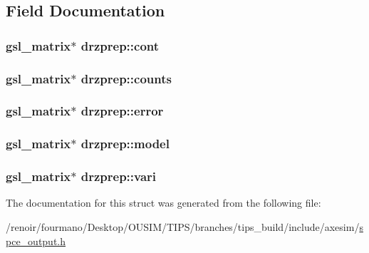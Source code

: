 \subsection{Field Documentation}
\hypertarget{structdrzprep_a65b1b1ebedbc949e2536415ac83b5427}{
\subsubsection[{cont}]{\setlength{\rightskip}{0pt plus 5cm}gsl\_\-matrix$\ast$ {\bf drzprep::cont}}}
\label{structdrzprep_a65b1b1ebedbc949e2536415ac83b5427}
\hypertarget{structdrzprep_a215f7390764932e09f5589bf97c52aec}{
\subsubsection[{counts}]{\setlength{\rightskip}{0pt plus 5cm}gsl\_\-matrix$\ast$ {\bf drzprep::counts}}}
\label{structdrzprep_a215f7390764932e09f5589bf97c52aec}
\hypertarget{structdrzprep_a105921a3d8442eacc2a7f6f98e8d06f9}{
\subsubsection[{error}]{\setlength{\rightskip}{0pt plus 5cm}gsl\_\-matrix$\ast$ {\bf drzprep::error}}}
\label{structdrzprep_a105921a3d8442eacc2a7f6f98e8d06f9}
\hypertarget{structdrzprep_ad0fd183b34cc7ee92112db1a31185fb6}{
\subsubsection[{model}]{\setlength{\rightskip}{0pt plus 5cm}gsl\_\-matrix$\ast$ {\bf drzprep::model}}}
\label{structdrzprep_ad0fd183b34cc7ee92112db1a31185fb6}
\hypertarget{structdrzprep_a0039f4cd84c8b2f6c0ea10cac1bc1b37}{
\subsubsection[{vari}]{\setlength{\rightskip}{0pt plus 5cm}gsl\_\-matrix$\ast$ {\bf drzprep::vari}}}
\label{structdrzprep_a0039f4cd84c8b2f6c0ea10cac1bc1b37}


The documentation for this struct was generated from the following file:\begin{DoxyCompactItemize}
\item 
/renoir/fourmano/Desktop/OUSIM/TIPS/branches/tips\_\-build/include/axesim/\hyperlink{spce__output_8h}{spce\_\-output.h}\end{DoxyCompactItemize}
